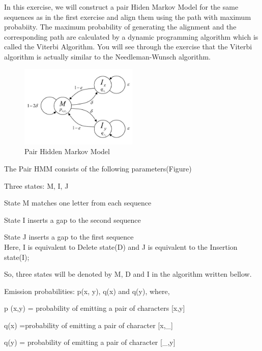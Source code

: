 \documentclass[a4paper,11pt]{article}
\begin{document}
In this exercise, we will construct a pair Hiden Markov Model for
the same sequences as in the first exercise and align them using the
path with maximum probabiity. The maximum probability of generating
the alignment and the corresponding path are calculated by a dynamic
programming algorithm which is called the Viterbi Algorithm. You will
see through the exercise that the Viterbi algorithm is actually similar
to the Needleman-Wunsch algorithm.

%
\begin{figure}[h]
\begin{center}
\includegraphics[width=0.5\textwidth]{HMM.jpg}\caption{Pair Hidden Markov Model}

\end{center}

%
\end{figure}


The Pair HMM consists of the following parameters(Figure)

\vspace{0.5cm}

Three states: M, I, J

State M matches one letter from each sequence

State I inserts a gap to the second sequence

State J inserts a gap to the first sequence\\


Here, I is equivalent to Delete state(D) and J is equivalent to the Insertion state(I);


So, three states will be denoted by M, D and I in the algorithm written bellow.
\vspace{0.5cm}

Emission probabilities: p(x, y), q(x) and q(y), where, 

p (x,y) = probability of emitting a pair of characters {[}x,y{]}

q(x) =probability of emitting a pair of character {[}x,\_{]}

q(y) = probability of emitting a pair of character {[}\_,y{]}
\end{document}
